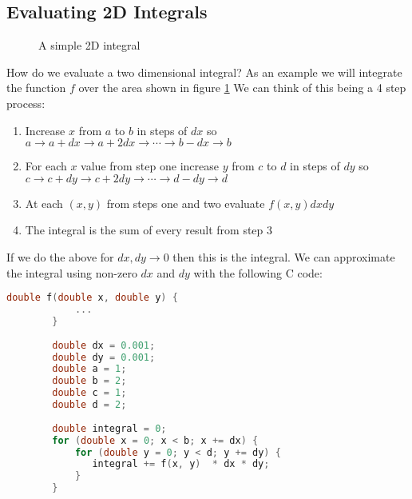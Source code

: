 \documentclass{article}
\begin{document}
    \subsection{Evaluating 2D Integrals}
    \begin{figure}[ht]
        \centering
        \caption{A simple 2D integral}
        \label{fig:simple 2D integral}
    \end{figure}
    How do we evaluate a two dimensional integral?
    As an example we will integrate the function \(f\) over the area shown in figure \ref{fig:simple 2D integral}
    We can think of this being a 4 step process:
    \begin{enumerate}
        \item Increase \(x\) from \(a\) to \(b\) in steps of \(dx\) so \(a\to a + dx\to a + 2dx \to \dotsb\to b - dx\to b\)
        \item For each \(x\) value from step one increase \(y\) from \(c\) to \(d\) in steps of \(dy\) so \(c \to c + dy \to c + 2dy \to \dotsb \to d - dy\to d\)
        \item At each \((x, y)\) from steps one and two evaluate \(f(x, y)dxdy\)
        \item The integral is the sum of every result from step 3
    \end{enumerate}
    If we do the above for \(dx, dy\to 0\) then this is the integral.
    We can approximate the integral using non-zero \(dx\) and \(dy\) with the following C\hspace{-.05em}\raisebox{.4ex}{\tiny\textbf{++}} code:
    \begin{lstlisting}[language=C++]
        double f(double x, double y) {
            ...
        }
        
        double dx = 0.001;
        double dy = 0.001;
        double a = 1;
        double b = 2;
        double c = 1;
        double d = 2;
        
        double integral = 0;
        for (double x = 0; x < b; x += dx) {
            for (double y = 0; y < d; y += dy) {
               integral += f(x, y)  * dx * dy;
            }
        }
    \end{lstlisting}
\end{document}
